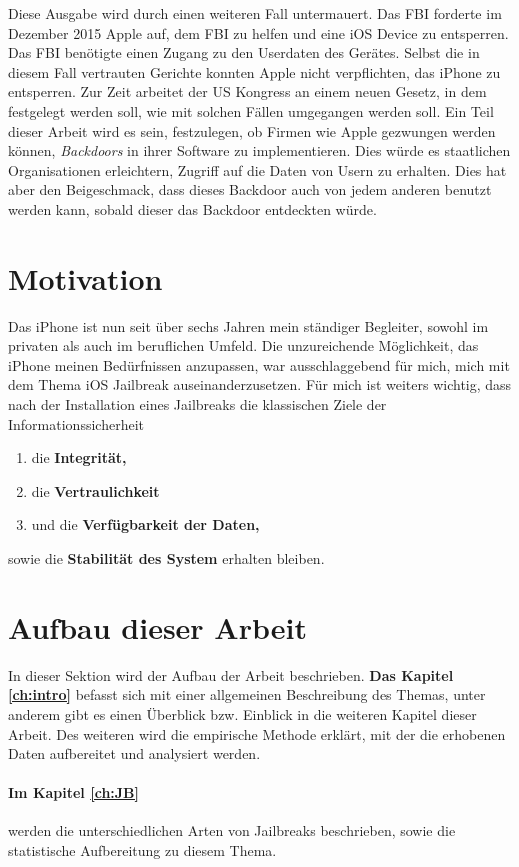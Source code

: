 Diese Ausgabe wird durch einen weiteren Fall untermauert. Das FBI forderte im Dezember 2015 Apple auf, dem FBI zu helfen und eine iOS Device zu entsperren. Das FBI benötigte einen Zugang zu den Userdaten des Gerätes. Selbst die in diesem Fall vertrauten Gerichte konnten Apple nicht verpflichten, das iPhone zu entsperren. Zur Zeit arbeitet der US Kongress an einem neuen Gesetz, in dem festgelegt werden soll, wie mit solchen Fällen umgegangen werden soll. Ein Teil dieser Arbeit wird es sein, festzulegen, ob Firmen wie Apple gezwungen werden können, \textit{\glqq Backdoors\grqq{}} in ihrer Software zu implementieren. Dies würde es staatlichen Organisationen erleichtern, Zugriff auf die Daten von Usern zu erhalten. Dies hat aber den Beigeschmack, dass dieses Backdoor auch von jedem anderen benutzt werden kann, sobald dieser das Backdoor entdeckten würde. 

\section{Motivation }
\label{sec:IntroMotivation}
Das iPhone ist nun seit über sechs Jahren mein ständiger Begleiter, sowohl im privaten als auch im beruflichen Umfeld. Die unzureichende Möglichkeit, das iPhone meinen Bedürfnissen anzupassen, war ausschlaggebend für mich, mich mit dem Thema iOS Jailbreak auseinanderzusetzen. 
Für mich ist weiters wichtig, dass nach der Installation eines Jailbreaks die klassischen Ziele der Informationssicherheit
\begin{enumerate}
    \item die \textbf{Integrität,}
    \item die \textbf{Vertraulichkeit} 
    \item und die \textbf{Verfügbarkeit der Daten,}
\end{enumerate}
sowie die \textbf{Stabilität des System} erhalten bleiben.


\section{Aufbau dieser Arbeit}
\label{sec:IntroAufbau}
In dieser Sektion wird der Aufbau der Arbeit beschrieben. \textbf{Das Kapitel \ref{ch:intro}} befasst sich mit einer allgemeinen Beschreibung des Themas, unter anderem gibt es einen Überblick bzw. Einblick in die weiteren Kapitel dieser Arbeit. Des weiteren wird die empirische Methode erklärt, mit der die erhobenen Daten aufbereitet und analysiert werden. 

\paragraph{Im Kapitel \ref{ch:JB}} werden die unterschiedlichen Arten von Jailbreaks beschrieben, sowie die statistische Aufbereitung zu diesem Thema.


